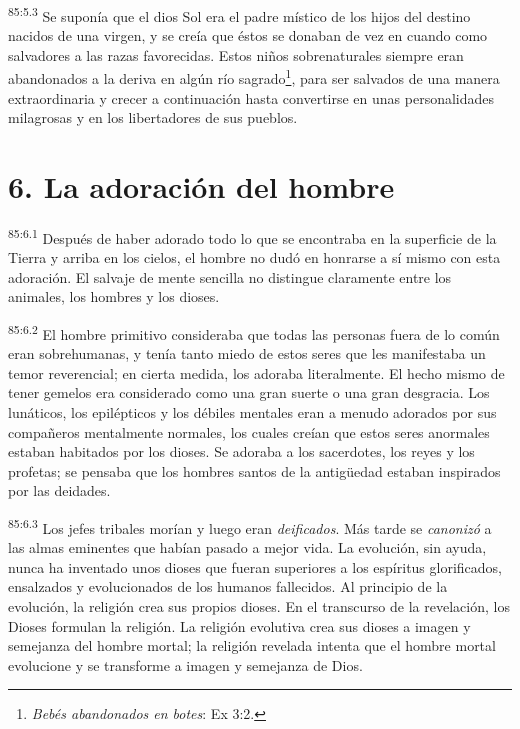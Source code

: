 \documentclass[twoside, 11pt]{book}
\begin{document}
\par
\textsuperscript{85:5.3} Se suponía que el dios Sol era el padre místico de los hijos del destino nacidos de una virgen, y se creía que éstos se donaban de vez en cuando como salvadores a las razas favorecidas. Estos niños sobrenaturales siempre eran abandonados a la deriva en algún río sagrado\footnote{\textit{Bebés abandonados en botes}: Ex 3:2.}, para ser salvados de una manera extraordinaria y crecer a continuación hasta convertirse en unas personalidades milagrosas y en los libertadores de sus pueblos.

\section*{6. La adoración del hombre}
\par
\textsuperscript{85:6.1} Después de haber adorado todo lo que se encontraba en la superficie de la Tierra y arriba en los cielos, el hombre no dudó en honrarse a sí mismo con esta adoración. El salvaje de mente sencilla no distingue claramente entre los animales, los hombres y los dioses.

\par
\textsuperscript{85:6.2} El hombre primitivo consideraba que todas las personas fuera de lo común eran sobrehumanas, y tenía tanto miedo de estos seres que les manifestaba un temor reverencial; en cierta medida, los adoraba literalmente. El hecho mismo de tener gemelos era considerado como una gran suerte o una gran desgracia. Los lunáticos, los epilépticos y los débiles mentales eran a menudo adorados por sus compañeros mentalmente normales, los cuales creían que estos seres anormales estaban habitados por los dioses. Se adoraba a los sacerdotes, los reyes y los profetas; se pensaba que los hombres santos de la antig\"uedad estaban inspirados por las deidades.

\par
\textsuperscript{85:6.3} Los jefes tribales morían y luego eran \textit{deificados}. Más tarde se \textit{canonizó} a las almas eminentes que habían pasado a mejor vida. La evolución, sin ayuda, nunca ha inventado unos dioses que fueran superiores a los espíritus glorificados, ensalzados y evolucionados de los humanos fallecidos. Al principio de la evolución, la religión crea sus propios dioses. En el transcurso de la revelación, los Dioses formulan la religión. La religión evolutiva crea sus dioses a imagen y semejanza del hombre mortal; la religión revelada intenta que el hombre mortal evolucione y se transforme a imagen y semejanza de Dios.
\end{document}
